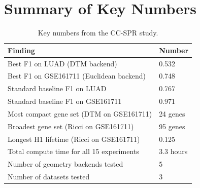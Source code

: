 \documentclass[11pt]{article}
\begin{document}
\section{Summary of Key Numbers}
\label{sec:numbers}

\begin{table}[h]
\centering
\small
\begin{tabular}{p{7cm}l}
\toprule
\textbf{Finding} & \textbf{Number} \\
\midrule
Best F1 on LUAD (DTM backend) & 0.532 \\
Best F1 on GSE161711 (Euclidean backend) & 0.748 \\
Standard baseline F1 on LUAD & 0.767 \\
Standard baseline F1 on GSE161711 & 0.971 \\
Most compact gene set (DTM on GSE161711) & 24 genes \\
Broadest gene set (Ricci on GSE161711) & 95 genes \\
Longest H1 lifetime (Ricci on GSE161711) & 0.125 \\
Total compute time for all 15 experiments & 3.3 hours \\
Number of geometry backends tested & 5 \\
Number of datasets tested & 3 \\
\bottomrule
\end{tabular}
\caption{Key numbers from the CC-SPR study.}
\end{table}
\end{document}
